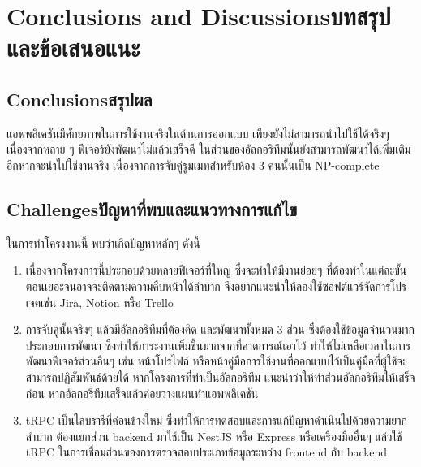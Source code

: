 \chapter{\ifenglish Conclusions and Discussions\else บทสรุปและข้อเสนอแนะ\fi}

\section{\ifenglish Conclusions\else สรุปผล\fi}

แอพพลิเคชันมีศักยภาพในการใช้งานจริงในด้านการออกแบบ เพียงยังไม่สามารถนำไปใช้ได้จริงๆ เนื่องจากหลาย ๆ ฟีเจอร์ยังพัฒนาไม่แล้วเสร็จดี
ในส่วนของอัลกอริทึมนั้นยังสามารถพัฒนาได้เพิ่มเติมอีกหากจะนำไปใช้งานจริง เนื่องจากการจับคู่รูมเมทสำหรับห้อง 3 คนนั้นเป็น
NP-complete

\section{\ifenglish Challenges\else ปัญหาที่พบและแนวทางการแก้ไข\fi}

ในการทำโครงงานนี้ พบว่าเกิดปัญหาหลักๆ ดังนี้
\begin{enumerate}
  \item เนื่องจากโครงการนี้ประกอบด้วยหลายฟีเจอร์ที่ใหญ่ ซึ่งจะทำให้มีงานย่อยๆ ที่ต้องทำในแต่ละขั้นตอนเยอะจนอาจจะติดตามความคืบหน้าได้ลำบาก
        จึงอยากแนะนำให้ลองใช้ซอฟต์แวร์จัดการโปรเจคเช่น Jira, Notion หรือ Trello
  \item การจับคู่นั้นจริงๆ แล้วมีอัลกอริทึมที่ต้องคิด และพัฒนาทั้งหมด 3 ส่วน ซึ่งต้องใช้ข้อมูลจำนวนมากประกอบการพัฒนา
        ซึ่งทำให้ภาระงานเพิ่มขึ้นมากจากที่คาดการณ์เอาไว้ ทำให้ไม่เหลือเวลาในการพัฒนาฟีเจอร์ส่วนอื่นๆ เช่น หน้าโปรไฟล์ 
        หรือหน้าคู่มือการใช้งานที่ออกแบบไว้เป็นคู่มือที่ผู้ใช้จะสามารถปฏิสัมพันธ์ด้วยได้ หากโครงการที่ทำเป็นอัลกอริทึม แนะนำว่าให้ทำส่วนอัลกอริทึมให้เสร็จก่อน
        หากอัลกอริทึมเสร็จแล้วค่อยวางแผนทำแอพพลิเคชัน
  \item tRPC เป็นไลบรารีที่ค่อนข้างใหม่ ซึ่งทำให้การทดสอบและการแก้ปัญหาดำเนินไปด้วยความยากลำบาก ต้องแยกส่วน backend มาใช้เป็น 
        NestJS หรือ Express หรือเครื่องมืออื่นๆ แล้วใช้ tRPC ในการเชื่อมส่วนของการตรวจสอบประเภทข้อมูลระหว่าง frontend กับ backend
\end{enumerate}


